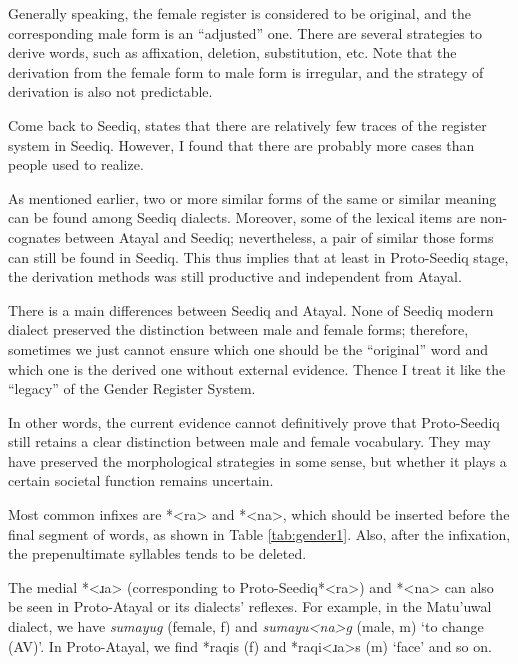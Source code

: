 \documentclass[12pt]{article}
\newcommand{\psedf}{Proto-Seediq\xspace}
\begin{document}
Generally speaking, the female register is considered to be original, and the corresponding male form is an ``adjusted'' one. There are several strategies to derive words, such as affixation, deletion, substitution, etc. Note that the derivation from the female form to male form is irregular, and the strategy of derivation is also not predictable.

Come back to Seediq, \textcite[157]{goderich2020phd} states that there are relatively few traces of the register system in Seediq. However, I found that there are probably more cases than people used to realize. 

As mentioned earlier, two or more similar forms of the same or similar meaning can be found among Seediq dialects. Moreover, some of the lexical items are non-cognates between Atayal and Seediq; nevertheless, a pair of similar those forms can still be found in Seediq. This thus implies that at least in Proto-Seediq stage, the derivation methods was still productive and independent from Atayal.

There is a main differences between Seediq and Atayal. None of Seediq modern dialect preserved the distinction between male and female forms; therefore, sometimes we just cannot ensure which one should be the ``original'' word and which one is the derived one without external evidence. Thence I treat it like the ``legacy'' of the Gender Register System. 

In other words, the current evidence cannot definitively prove that \psedf still retains a clear distinction between male and female vocabulary. They may have preserved the morphological strategies in some sense, but whether it plays a certain societal function remains uncertain.


Most common infixes are *<ra> and *<na>, which should be inserted before the final segment of words, as shown in Table \ref{tab:gender1}. Also, after the infixation, the prepenultimate syllables tends to be deleted. 

The medial *<ɹa> (corresponding to \psedf *<ra>) and *<na> can also be seen in Proto-Atayal or its dialects' reflexes. For example, in the Matu'uwal dialect, we have \textit{sumayug} (female, f) and \textit{sumayu<na>g} (male, m) `to change (AV)'.  In Proto-Atayal, we find *raqis (f) and *raqi<ɹa>s (m) `face' and so on. 
\end{document}
